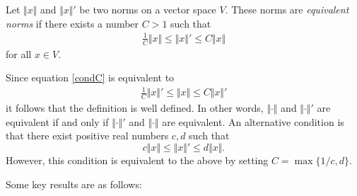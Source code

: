 \documentclass[12pt]{article}
\begin{document}
Let $\Vert x\Vert$ and $\Vert x\Vert' $ be two norms on
a vector space $V$. These norms are \emph{equivalent norms} if
there exists a number $C>1$ such that
\begin{eqnarray}
\label{condC}
 \frac{1}{C} \Vert x\Vert \le \Vert x\Vert' \le C \Vert x\Vert
\end{eqnarray}
for all $x\in V$.

Since equation \eqref{condC} is equivalent to
\begin{eqnarray}
\label{condC1}
 \frac{1}{C} \Vert x\Vert ' \le \Vert x\Vert \le C \Vert x\Vert'
\end{eqnarray}
it follows that the definition is well defined. In other words,
$\Vert\cdot \Vert$ and $\Vert\cdot \Vert'$ are equivalent if and only if
$\Vert\cdot \Vert'$ and $\Vert\cdot \Vert$ are equivalent.
An alternative condition is that there exist positive real
numbers $c,d$ such that
$$
 c\Vert x\Vert \le \Vert x \Vert' \le d \Vert x\Vert.
$$
However, this condition is equivalent to the above
by setting $C=\max\{1/c,d\}$.

Some key results are as follows:
\end{document}
